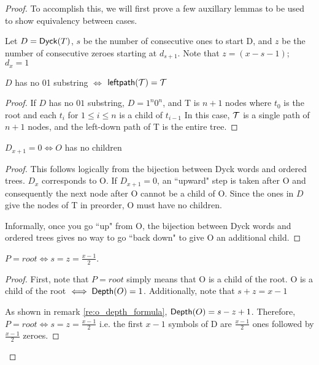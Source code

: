 \begin{proof}
To accomplish this, we will first prove a few auxillary lemmas to be used to show equivalency between cases. 

Let $D=\mathsf{Dyck}{(T)}$, $s$ be the number of consecutive ones to start D, and $z$ be the number of consecutive zeroes starting at $d_{s+1}$.  Note that $z=(x-s-1)$; $d_{x}=1$
\begin{lemma} \label{le:final_case_equivalence}

    $D$ has no 01 substring $\iff$ $\mathsf{leftpath}{(\mathcal{\mathcal{T}})}=\mathcal{T}$
\end{lemma}
\begin{proof}


    If $D$ has no $01$ substring, $D=1^n0^n$, and T is $n+1$ nodes where $t_0$ is the root and each $t_i$ for $1\le i \le n$ is a child of $t_{i-1}$  In this case, $\mathcal{T}$ is a single path of $n+1$ nodes, and the left-down path of T is the entire tree.
\end{proof}
\begin{lemma} \label{le:no_children_equivalence}
    $D_{x+1} = 0 \iff O$ has no children
\end{lemma}
\begin{proof}

    This follows logically from the bijection between Dyck words and ordered trees.  $D_x$ corresponds to O.  If $D_{x+1}=0$, an ``upward" step is taken after O and consequently the next node after O cannot be a child of O.  Since the ones in $D$ give the nodes of T in preorder, O must have no children.

    Informally, once you go ``up" from O, the bijection between Dyck words and ordered trees gives no way to go ``back down" to give O an additional child.
\end{proof}
\begin{lemma} \label{le:tight_case_equivalence}
    $P=root \iff s=z=\frac{x-1}{2}$.
\end{lemma}
\begin{proof}

    First, note that $P=root$ simply means that O is a child of the root.  O is a child of the root $\iff \mathsf{Depth}{(O)}=1$.  Additionally, note that $s+z=x-1$

    As shown in remark \ref{re:o_depth_formula}, $\mathsf{Depth}{(O)}=s-z+1$. Therefore, $P=root \iff s=z=\frac{x-1}{2}$
    i.e. the first $x-1$ symbols of D are $\frac{x-1}{2}$ ones followed by $\frac{x-1}{2}$ zeroes. 



\end{proof}
\end{proof}
